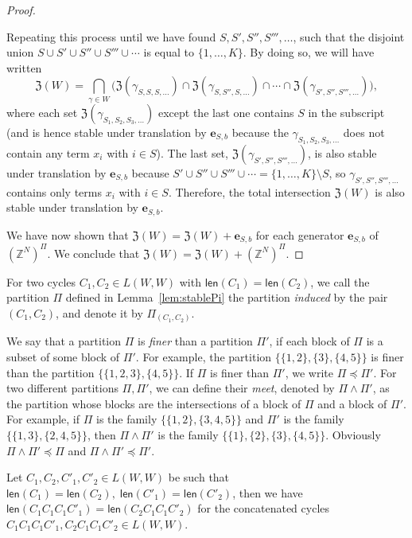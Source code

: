 \documentclass[letterpaper, 11pt, thm-restate]{article}
\numberwithin{equation}{section}
\newcommand{\Z}{\mathbb{Z}}
\newcommand{\mZ}{\mathfrak{Z}}
\newcommand{\be}{\boldsymbol{e}}
\newcommand{\len}{\mathsf{len}}
\theoremstyle{definition}
\theoremstyle{definition}
\theoremstyle{definition}
\begin{document}
\begin{proof}
\begin{enumerate}[nosep, wide, label=\textbf{Case~\arabic*:}]
    Repeating this process until we have found $S, S', S'', S''', \ldots$, such that the disjoint union $S \cup S' \cup S'' \cup S''' \cup \cdots$ is equal to $\{1, \ldots, K\}$.
    By doing so, we will have written
    \[
    \mZ(W) = \bigcap_{\gamma \in W} \big(\mZ(\gamma_{S, S, S, \ldots}) \cap \mZ(\gamma_{S, S'', S, \ldots}) \cap \cdots \cap \mZ(\gamma_{S', S'', S''', \ldots}) \big),
    \]
    where each set $\mZ(\gamma_{S_1, S_2, S_3, \ldots})$ except the last one contains $S$ in the subscript (and is hence stable under translation by $\be_{S, b}$ because the $\gamma_{S_1, S_2, S_3, \ldots}$ does not contain any term $x_i$ with $i \in S$).
    The last set, $\mZ(\gamma_{S', S'', S''', \ldots})$, is also stable under translation by $\be_{S, b}$ because $S' \cup S'' \cup S''' \cup \cdots = \{1, \ldots, K\} \setminus S$, so $\gamma_{S', S'', S''', \ldots}$ contains only terms $x_i$ with $i \in S$.
    Therefore, the total intersection $\mZ(W)$ is also stable under translation by $\boldsymbol{e}_{S, b}$.
    \end{enumerate}
    
    We have now shown that $\mZ(W) = \mZ(W) + \be_{S, b}$ for each generator $\be_{S, b}$ of $(\Z^N)^{\Pi}$.
    We conclude that $\mZ(W) = \mZ(W) + (\Z^N)^{\Pi}$.
\end{proof}

For two cycles $C_1, C_2 \in L(W, W)$ with $\len(C_1) = \len(C_2)$, we call the partition $\Pi$ defined in Lemma~\ref{lem:stablePi} the partition \emph{induced} by the pair $(C_1, C_2)$, and denote it by $\Pi_{(C_1, C_2)}$.

We say that a partition $\Pi$ is \emph{finer} than a partition $\Pi'$, if each block of $\Pi$ is a subset of some block of $\Pi'$.
For example, the partition $\big\{\{1,2\},\{3\}, \{4, 5\}\big\}$ is finer than the partition $\big\{\{1,2,3\}, \{4, 5\}\big\}$.
If $\Pi$ is finer than $\Pi'$, we write $\Pi \preceq \Pi'$.
For two different partitions $\Pi, \Pi'$, we can define their \emph{meet}, denoted by $\Pi \wedge \Pi'$, as the partition whose blocks are the intersections of a block of $\Pi$ and a block of $\Pi'$.
For example, if $\Pi$ is the family $\big\{\{1,2\},\{3, 4, 5\}\big\}$ and $\Pi'$ is the family $\big\{\{1,3\},\{2, 4, 5\}\big\}$, then $\Pi \wedge \Pi'$ is the family $\big\{\{1\},\{2\},\{3\}, \{4, 5\}\big\}$.
Obviously $\Pi \wedge \Pi' \preceq \Pi$ and $\Pi \wedge \Pi' \preceq \Pi'$.

Let $C_1, C_2, C'_1, C'_2 \in L(W, W)$ be such that $\len(C_1) = \len(C_2),\; \len(C'_1) = \len(C'_2)$, then we have $\len(C_1C_1C_1C'_1) = \len(C_2C_1C_1C'_2)$ for the concatenated cycles $C_1C_1C_1C'_1, C_2C_1C_1C'_2 \in L(W, W)$.
\end{document}
